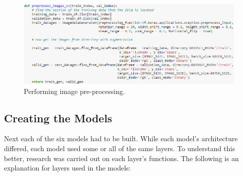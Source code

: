 \begin{figure}[H]
    \centering
    \includegraphics[width=\textwidth]{figures/image-preprocessing.png}
    \caption{Performing image pre-processing.}
    \label{fig:image-preprocessing}
\end{figure}

\subsection{Creating the Models}
Next each of the six models had to be built. While each model's architecture differed, each model used some or all of the same layers. To understand this better, research was carried out on each layer's functions. The following is an explanation for layers used in the models:


